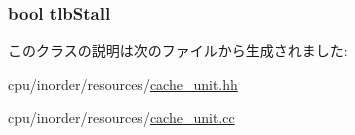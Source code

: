 \label{classCacheRequest_a8116e141a645f1d034f40e047d3a3ec1}
\hypertarget{classCacheRequest_ac4aba9c9cde03862a74bf4131670be4b}{
\subsubsection[{tlbStall}]{\setlength{\rightskip}{0pt plus 5cm}bool {\bf tlbStall}}}
\label{classCacheRequest_ac4aba9c9cde03862a74bf4131670be4b}


このクラスの説明は次のファイルから生成されました:\begin{DoxyCompactItemize}
\item 
cpu/inorder/resources/\hyperlink{cache__unit_8hh}{cache\_\-unit.hh}\item 
cpu/inorder/resources/\hyperlink{cache__unit_8cc}{cache\_\-unit.cc}\end{DoxyCompactItemize}
